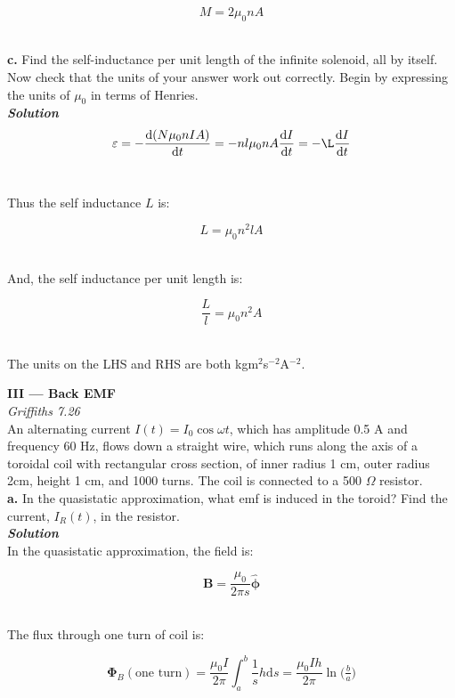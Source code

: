 \documentclass[14pt]{extarticle}
\renewcommand{\v}[1]{{\bm #1}}
\newcommand{\hv}[1]{\hat{\bm{#1}}}
\newcommand{\bfit}[1]{\textbf{\textit{#1}}}
\renewcommand{\d}{\text{d}}
\newcommand{\ddt}[1]{\frac{\d #1}{\d t}}
\newcommand{\muo}{\mu_0}
\begin{document}
$$M = 2\muo nA$$ \ 




\dotfill 

\hfill 

{\Large \bf c.} Find the self-inductance per unit length of the infinite solenoid, all by itself. Now check that the units of your answer work out correctly. Begin by expressing the units of $\muo$ in terms of Henries. \\ 

{\bfit{Solution}} \\ 

$$\varepsilon = -\ddt{(N\muo n IA)} =  -nl \muo  n A \ddt I  = -\L \ddt I$$ \ 

Thus the self inductance $L$ is:

$$L = \muo n^2 lA$$ \ 

And, the self inductance per unit length is:

$$\frac Ll = \muo n^2 A$$ \ 

The units on the LHS and RHS are both kgm$^2$s$^{-2}$A$^{-2}$. \\ 






\hrulefill 

\hfill 

{\LARGE \bf III --- Back EMF} \\ 

{\it Griffiths 7.26} \\ 

An alternating current $I(t) = I_0\cos\omega t$, which  has  amplitude 0.5 A and frequency 60 Hz, flows down a straight wire, which runs along the axis of a toroidal coil with rectangular cross section,  of inner radius 1 cm, outer radius 2cm, height 1 cm, and 1000 turns. The coil is connected to a 500 $\Omega$ resistor. \\ 

{\bf \Large a.} In  the quasistatic approximation, what emf is induced in the toroid? Find the current, $I_R(t)$, in the resistor. \\ 

{\bfit{Solution}} \\ 

In the quasistatic approximation, the field is:

$$\v B = \frac{\muo}{2\pi s} \hv \phi$$ \ 

The flux through one turn of coil is:

$$\v \Phi_B (\text{one turn}) = \frac{\muo I}{2\pi} \int_a^b \frac 1s h \d s = \frac{\muo I h}{2\pi} \ln \big( \tfrac ba \big)$$ \ 
\end{document}

